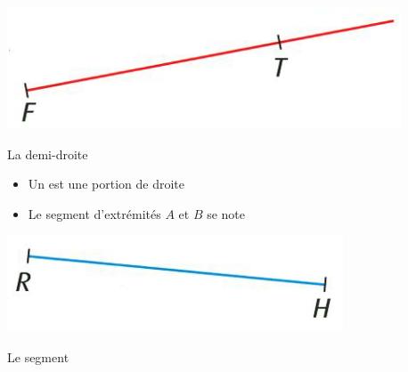 \begin{myex}
	\begin{center}
		\includegraphics[scale=0.55]{img/demi-droite}
	\end{center}

	 La demi-droite
\end{myex}

\begin{mydef}
	\begin{itemize}
		\item Un  est une portion de droite \\%
		
		\item Le segment d'extrémités $A$ et $B$ se note %
	\end{itemize}
\end{mydef}


\begin{myex}
	\begin{center}
		\includegraphics[scale=0.55]{img/segment}
	\end{center}
	
	Le segment 
\end{myex}